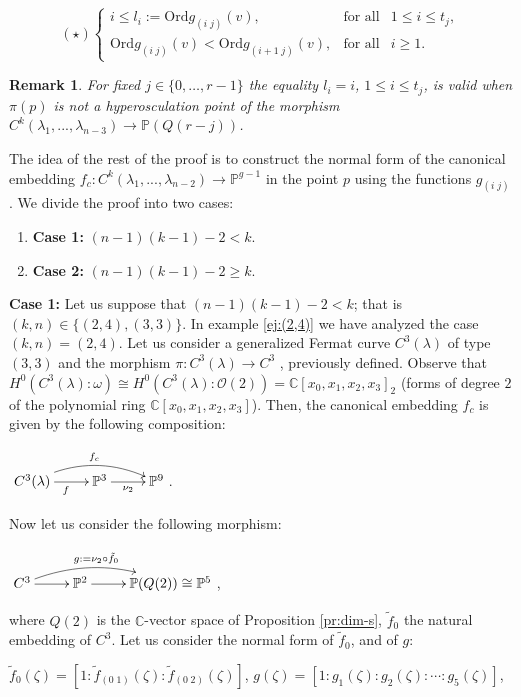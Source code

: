 \documentclass{amsart}
\newcommand{\C}[3]{\ensuremath{C^{#1}(#3_1,...,#3_{#2})}}
\newtheorem{remark}[theorem]{Remark}
\begin{document}
$$(\star) \left \{\begin{array}{lll}
i\leq l_i:= {\mathrm{Ord}} g_{(i\; j)}(v),& \mbox{for all}& 1\leq i\leq t_j,\\
{\mathrm{Ord}} g_{(i\; j)}(v)< {\mathrm{Ord}} g_{(i+1\; j)}(v),& \mbox{for all} & i\geq 1.
\end{array} \right.$$


 
\begin{remark} \label{re:li=i}
For fixed $j \in \{0, \ldots, r-1\}$ the equality $l_i=i$, $1\leq i\leq t_j$, is valid when $\pi(p)$ is not a
 hyperosculation point of the  morphism  $\C{k}{n-3}{\lambda}\rightarrow {\mathbb{P}}(Q(r-j))$.  
\end{remark}


The idea of the rest of the proof is to construct the normal form of the canonical embedding $f_c:\C{k}{n-2}{\lambda}\rightarrow {\mathbb{P}}^{g-1}$ in the point $p$ using the functions $g_{(i\; j)}$. We divide the proof into two cases:  
\begin{enumerate}
\item[] {\bf Case 1:} $(n-1)(k-1)-2<k$.
\item[] {\bf Case 2:} $(n-1)(k-1)-2\geq k$.
\end{enumerate}

\smallskip
 \noindent
 {\bf Case 1:}
 Let us suppose that $(n-1)(k-1)-2<k$; that is $(k,n) \in \{(2,4),(3,3)\}$.
 In example \ref{ej:(2,4)} we have analyzed the case $(k,n)=(2,4)$. 
  Let us consider a generalized Fermat curve $C^3(\lambda)$ of type $(3,3)$ and the morphism $\pi:C^3(\lambda)\rightarrow C^3$ , previously defined.  
 Observe that  $H^{0}(C^3(\lambda):\omega)\cong H^{0}(C^3(\lambda):\mathcal{O}(2))={\mathbb{C}}[x_0,x_1,x_2,x_3]_2$ 
 (forms of degree $2$ of the polynomial ring  ${\mathbb{C}}[x_0,x_1,x_2,x_3]$).
 Then, the canonical embedding $f_c$ is given by the following composition:
 \begin{center}
 $\xymatrix{ C^3(\lambda) \ar[r]_{f}\ar@/^1pc/[rr]^{f_c} &{\mathbb{P}}^{3}\ar[r]_{\nu_{2}}&{\mathbb{P}}^9} $.
 \end{center}
Now let us consider the following morphism:  
\begin{center}
   $\xymatrix{ C^{3} \ar[r] \ar@/^1pc/[rr]^{g
   :=\nu_{2}\circ \tilde{f}_0}&{\mathbb{P}}^{2}\ar[r]&{\mathbb{P}}(Q(2))\cong {\mathbb{P}}^5}$, 
 \end{center}
 where $Q(2)$ is the ${\mathbb{C}}$-vector space of Proposition \ref{pr:dim-s}, 
 $\tilde{f}_0$ the natural embedding of $C^{3}$.  
	Let us consider the normal form of $\tilde{f}_0$, and of $g$:
 \begin{center}
   $\tilde{f}_{0}(\zeta)=[1:\tilde{f}_{(0\;1)}(\zeta):\tilde{f}_{(0\;2)}(\zeta)]$,  $g(\zeta)=[1:g_{1}(\zeta):g_{2}(\zeta):\cdots :g_{5}(\zeta)]$, 
 \end{center}
\end{document}
